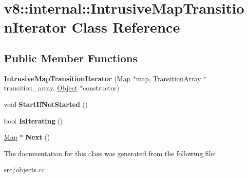 \hypertarget{classv8_1_1internal_1_1_intrusive_map_transition_iterator}{}\section{v8\+:\+:internal\+:\+:Intrusive\+Map\+Transition\+Iterator Class Reference}
\label{classv8_1_1internal_1_1_intrusive_map_transition_iterator}
\subsection*{Public Member Functions}
\begin{DoxyCompactItemize}
\item 
\hypertarget{classv8_1_1internal_1_1_intrusive_map_transition_iterator_a022749e4fe349b78f403b155f6a5df5d}{}{\bfseries Intrusive\+Map\+Transition\+Iterator} (\hyperlink{classv8_1_1internal_1_1_map}{Map} $\ast$map, \hyperlink{classv8_1_1internal_1_1_transition_array}{Transition\+Array} $\ast$transition\+\_\+array, \hyperlink{classv8_1_1internal_1_1_object}{Object} $\ast$constructor)\label{classv8_1_1internal_1_1_intrusive_map_transition_iterator_a022749e4fe349b78f403b155f6a5df5d}

\item 
\hypertarget{classv8_1_1internal_1_1_intrusive_map_transition_iterator_a77c3628a83875db88a70f42162877e1b}{}void {\bfseries Start\+If\+Not\+Started} ()\label{classv8_1_1internal_1_1_intrusive_map_transition_iterator_a77c3628a83875db88a70f42162877e1b}

\item 
\hypertarget{classv8_1_1internal_1_1_intrusive_map_transition_iterator_a35a88c777f626e0b877f2f5f601a8c22}{}bool {\bfseries Is\+Iterating} ()\label{classv8_1_1internal_1_1_intrusive_map_transition_iterator_a35a88c777f626e0b877f2f5f601a8c22}

\item 
\hypertarget{classv8_1_1internal_1_1_intrusive_map_transition_iterator_ae0d7a4e9e6e7c7beb02ebe8811eec93d}{}\hyperlink{classv8_1_1internal_1_1_map}{Map} $\ast$ {\bfseries Next} ()\label{classv8_1_1internal_1_1_intrusive_map_transition_iterator_ae0d7a4e9e6e7c7beb02ebe8811eec93d}

\end{DoxyCompactItemize}


The documentation for this class was generated from the following file\+:\begin{DoxyCompactItemize}
\item 
src/objects.\+cc\end{DoxyCompactItemize}

